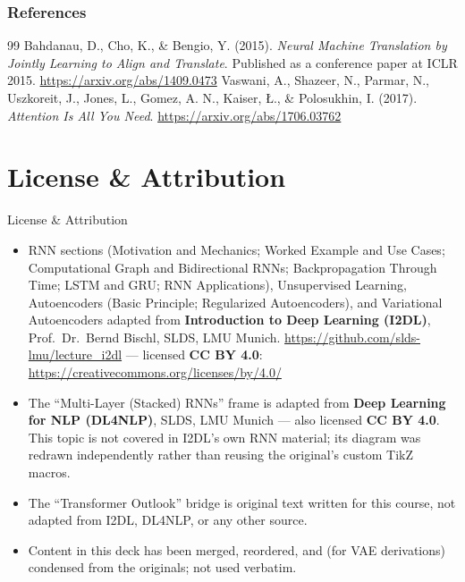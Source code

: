 \begin{vbframe}
\frametitle{References}
\footnotesize{
\begin{thebibliography}{99}
 Bahdanau, D., Cho, K., \& Bengio, Y. (2015). \textit{Neural Machine Translation by Jointly Learning to Align and Translate}. Published as a conference paper at ICLR 2015. \url{https://arxiv.org/abs/1409.0473}
 Vaswani, A., Shazeer, N., Parmar, N., Uszkoreit, J., Jones, L., Gomez, A. N., Kaiser, {\L}., \& Polosukhin, I. (2017). \textit{Attention Is All You Need}. \url{https://arxiv.org/abs/1706.03762}
\end{thebibliography}
}
\end{vbframe}

\section{License \& Attribution}

\begin{vbframe}{License \& Attribution}
\begin{itemize}
\item RNN sections (Motivation and Mechanics; Worked Example and Use Cases; Computational Graph and Bidirectional RNNs; Backpropagation Through Time; LSTM and GRU; RNN Applications), Unsupervised Learning, Autoencoders (Basic Principle; Regularized Autoencoders), and Variational Autoencoders
adapted from \textbf{Introduction to Deep Learning (I2DL)}, Prof.\ Dr.\
Bernd Bischl, SLDS, LMU Munich. \url{https://github.com/slds-lmu/lecture_i2dl}
--- licensed \textbf{CC BY 4.0}: \url{https://creativecommons.org/licenses/by/4.0/}
\item The \enquote{Multi-Layer (Stacked) RNNs} frame is adapted from \textbf{Deep Learning for NLP (DL4NLP)}, SLDS, LMU Munich --- also licensed \textbf{CC BY 4.0}. This topic is not covered in I2DL's own RNN material; its diagram was redrawn independently rather than reusing the original's custom TikZ macros.
\item The \enquote{Transformer Outlook} bridge is original text written for this course, not adapted from I2DL, DL4NLP, or any other source.
\item Content in this deck has been merged, reordered, and (for VAE derivations) condensed from the originals; not used verbatim.
\end{itemize}
\end{vbframe}

\endlecture


